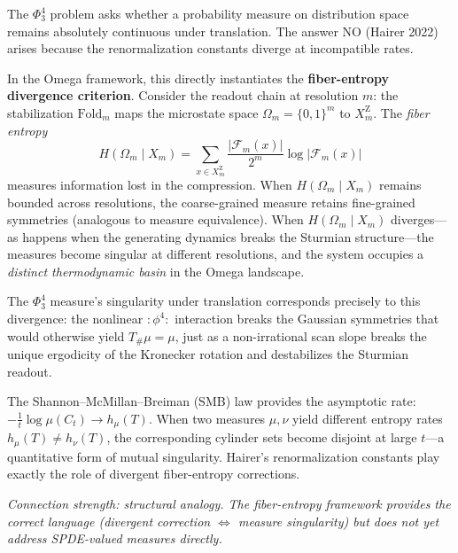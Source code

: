 \begin{remark}
The $\Phi^4_3$ problem asks whether a probability measure on
distribution space remains absolutely continuous under translation.
The answer NO (Hairer 2022) arises because the renormalization
constants diverge at incompatible rates.

In the Omega framework, this directly instantiates the
\textbf{fiber-entropy divergence criterion}.
Consider the readout chain at resolution $m$: the stabilization
$\mathrm{Fold}_m$ maps the microstate space $\Omega_m=\{0,1\}^m$
to $X_m^{\mathrm Z}$.  The \emph{fiber entropy}
\begin{equation}
H(\Omega_m\mid X_m)
= \sum_{x\in X_m^{\mathrm Z}} \frac{|\mathcal F_m(x)|}{2^m}
  \log|\mathcal F_m(x)|
\end{equation}
measures information lost in the compression.  When $H(\Omega_m\mid X_m)$
remains bounded across resolutions, the coarse-grained measure
retains fine-grained symmetries (analogous to measure equivalence).
When $H(\Omega_m\mid X_m)$ diverges---as happens when the
generating dynamics breaks the Sturmian structure---the measures
become singular at different resolutions, and the system occupies
a \emph{distinct thermodynamic basin} in the Omega landscape.

The $\Phi^4_3$ measure's singularity under translation corresponds
precisely to this divergence: the nonlinear $:\!\phi^4\!:$ interaction
breaks the Gaussian symmetries that would otherwise yield
$T_\#\mu=\mu$, just as a non-irrational scan slope breaks the
unique ergodicity of the Kronecker rotation and destabilizes the
Sturmian readout.

The Shannon--McMillan--Breiman (SMB) law provides the asymptotic rate:
$-\frac{1}{t}\log\mu(C_t)\to h_\mu(T)$.
When two measures $\mu,\nu$ yield different entropy rates
$h_\mu(T)\neq h_\nu(T)$, the corresponding cylinder sets become
disjoint at large $t$---a quantitative form of mutual singularity.
Hairer's renormalization constants play exactly the role of
divergent fiber-entropy corrections.

\emph{Connection strength: structural analogy.
The fiber-entropy framework provides the correct language
(divergent correction $\Leftrightarrow$ measure singularity)
but does not yet address SPDE-valued measures directly.}
\end{remark}


